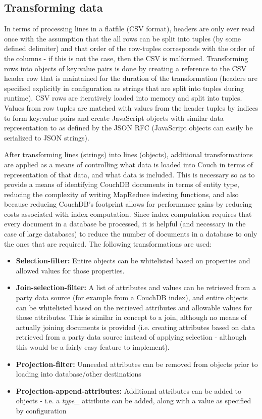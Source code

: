 \subsection{Transforming data}
In terms of processing lines in a flatfile (CSV format), headers are only ever read once with the assumption that the all rows can be split into tuples (by some defined delimiter) and that order of the row-tuples corresponds with the order of the columns - if this is not the case, then the CSV is malformed. Transforming rows into objects of key:value pairs is done by creating a reference to the CSV header row that is maintained for the duration of the transformation (headers are specified explicitly in configuration as strings that are split into tuples during runtime). CSV rows are iteratively loaded into memory and split into tuples. Values from row tuples are matched with values from the header tuples by indices to form key:value pairs and create JavaScript objects with similar data representation to as defined by the JSON RFC \cite{rfc7159} (JavaScript objects can easily be serialized to JSON strings).

After transforming lines (strings) into lines (objects), additional transformations are applied as a means of controlling what data is loaded into Couch in terms of representation of that data, and what data is included. This is necessary so as to provide a means of identifying CouchDB documents in terms of entity type, reducing the complexity of writing MapReduce indexing functions, and also because reducing CouchDB's footprint allows for performance gains by reducing costs associated with index computation. Since index computation requires that every document in a database be processed, it is helpful (and necessary in the case of large databases) to reduce the number of documents in a database to only the ones that are required. The following transformations are used:

\begin{itemize}
    \item \textbf{Selection-filter:} Entire objects can be whitelisted based on properties and allowed values for those properties.
    \item \textbf{Join-selection-filter:} A list of attributes and values can be retrieved from a  party data source (for example from a CouchDB index), and entire objects can be whitelisted based on the retrieved attributes and allowable values for those attributes. This is similar in concept to a join, although no means of actually joining documents is provided (i.e. creating attributes based on data retrieved from a  party data source instead of applying selection - although this would be a fairly easy feature to implement).
    \item \textbf{Projection-filter:} Unneeded attributes can be removed from objects prior to loading into database/other destinations
    \item \textbf{Projection-append-attributes:} Additional attributes can be added to objects - i.e. a \textit{type\_} attribute can be added, along with a value as specified by configuration
\end{itemize}

